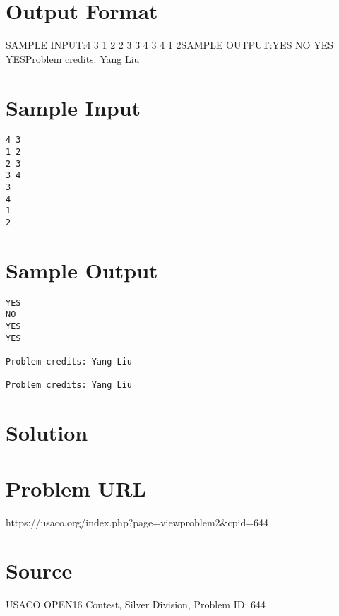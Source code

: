 \documentclass[12pt]{article}
\begin{document}
\section*{Output Format}
SAMPLE INPUT:4 3
1 2
2 3
3 4
3
4
1
2SAMPLE OUTPUT:YES
NO
YES
YESProblem credits: Yang Liu

\section*{Sample Input}
\begin{verbatim}
4 3
1 2
2 3
3 4
3
4
1
2
\end{verbatim}

\section*{Sample Output}
\begin{verbatim}
YES
NO
YES
YES

Problem credits: Yang Liu

Problem credits: Yang Liu
\end{verbatim}

\section*{Solution}


\section*{Problem URL}
https://usaco.org/index.php?page=viewproblem2&cpid=644

\section*{Source}
USACO OPEN16 Contest, Silver Division, Problem ID: 644
\end{document}
